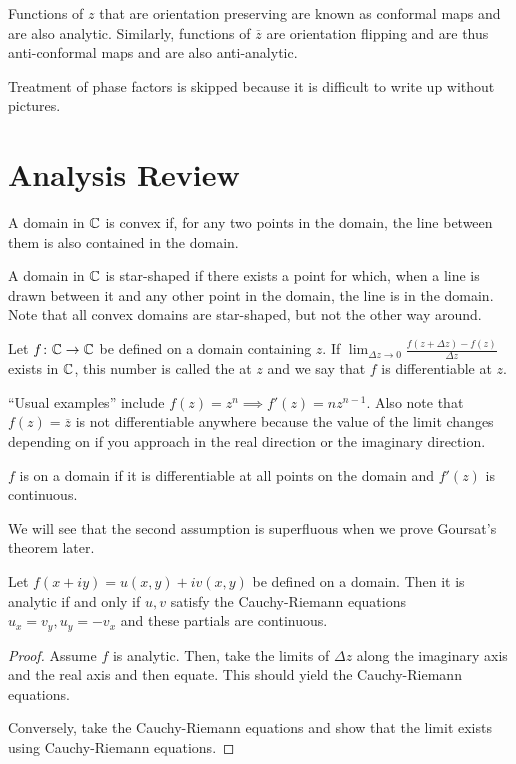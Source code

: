 \documentclass[11pt,leqno,oneside]{amsart}
\numberwithin{thm}{section}
\begin{document}
\begin{defn}
    Functions of $z$ that are orientation preserving are known as conformal
    maps and are also analytic. Similarly, functions of $\overline{z}$ are
    orientation flipping and are thus anti-conformal maps and are also
    anti-analytic.
\end{defn}

Treatment of phase factors is skipped because it is difficult to write up
without pictures.

\section*{Analysis Review}

\begin{defn}
A domain in ${\mathbb C}$ is convex if, for any two points in the domain, the line
between them is also contained in the domain.
\end{defn}
\begin{defn}
    A domain in ${\mathbb C}$ is star-shaped if there exists a point for which, when a
    line is drawn between it and any other point in the domain, the line is in
    the domain. Note that all convex domains are star-shaped, but not the other
    way around.
\end{defn}
\begin{defn}
    Let $f\colon {\mathbb C} \to {\mathbb C}$ be defined on a domain containing $z$. If $\lim_{\Delta
    z \to 0} \frac{f(z+\Delta z) - f(z)}{\Delta z}$ exists in ${\mathbb C}$, this number
    is called the  at $z$ and we say that $f$ is
    differentiable at $z$.
\end{defn}

``Usual examples'' include $f(z) = z^n \implies f'(z) = nz^{n-1}$. Also note
that $f(z) = \overline{z}$ is not differentiable anywhere because the value of
the limit changes depending on if you approach in the real direction or the
imaginary direction.
\begin{defn}
    $f$ is  on a domain if it is differentiable at all points on
    the domain and $f'(z)$ is continuous.
\end{defn}
We will see that the second assumption is superfluous when we prove Goursat's
theorem later.

\begin{thm}
    Let $f(x+iy) = u(x,y)+iv(x,y)$ be defined on a domain. Then it is analytic
    if and only if $u,v$ satisfy the Cauchy-Riemann equations $u_x = v_y, u_y =
    -v_x$ and these partials are continuous.
\end{thm}
\begin{proof}
    Assume $f$ is analytic. Then, take the limits of $\Delta z$ along the
    imaginary axis and the real axis and then equate. This should yield the
    Cauchy-Riemann equations.

    Conversely, take the Cauchy-Riemann equations and show that the limit
    exists using Cauchy-Riemann equations.
\end{proof}
\end{document}
